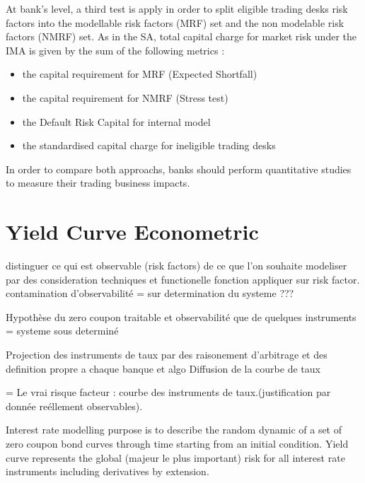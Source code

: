 \documentclass[3pt]{article}
\begin{document}
\bigskip

At bank's level, a third test is apply in order to split eligible trading
desks risk factors into the modellable risk factors (MRF) set and the non
modelable risk factors (NMRF) set. As in the SA, total capital charge for
market risk under the IMA is given by the sum of the following metrics :

\bigskip

\begin{itemize}
\item the capital requirement for MRF (Expected Shortfall)

\item the capital requirement for NMRF (Stress test)

\item the Default Risk Capital for internal model

\item the standardised capital charge for ineligible trading desks
\end{itemize}

\bigskip 

In order to compare both approachs, banks should perform quantitative
studies to measure their trading business impacts.

\section{Yield Curve Econometric}

\bigskip distinguer ce qui est observable (risk factors) de ce que l'on
souhaite modeliser par des consideration techniques et functionelle fonction
appliquer sur risk factor. contamination d'observabilit\'{e} =\TEXTsymbol{>}
sur determination du systeme ???

Hypoth\`{e}se du zero coupon traitable et observabilit\'{e} que de quelques
instruments =\TEXTsymbol{>} systeme sous determin\'{e}

Projection des instruments de taux par des raisonement d'arbitrage et des
definition propre a chaque banque et algo Diffusion de la courbe de taux

=\TEXTsymbol{>} Le vrai risque facteur : courbe des instruments de
taux.(justification par donn\'{e}e re\'{e}llement observables).

Interest rate modelling purpose is to describe the random dynamic of a set
of zero coupon bond curves through time starting from an initial condition.
Yield curve represents the global (majeur le plus important) risk for all
interest rate instruments including derivatives by extension.
\end{document}
